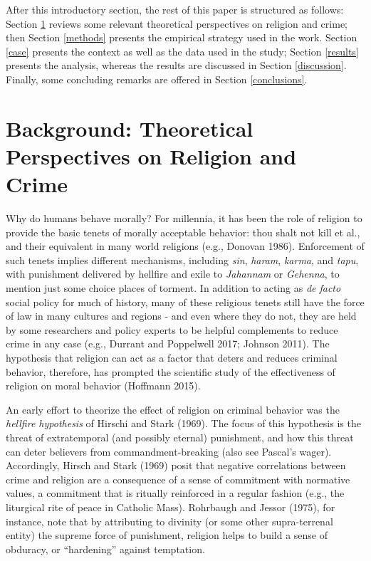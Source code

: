 \documentclass[smallextended]{svjour3}       %
\begin{document}
After this introductory section, the rest of this paper is structured as
follows: Section \ref{background} reviews some relevant theoretical
perspectives on religion and crime; then Section \ref{methods} presents
the empirical strategy used in the work. Section \ref{case} presents the
context as well as the data used in the study; Section \ref{results}
presents the analysis, whereas the results are discussed in Section
\ref{discussion}. Finally, some concluding remarks are offered in
Section \ref{conclusions}.

\hypertarget{background}{%
\section{Background: Theoretical Perspectives on Religion and
Crime}\label{background}}

Why do humans behave morally? For millennia, it has been the role of
religion to provide the basic tenets of morally acceptable behavior:
thou shalt not kill et al., and their equivalent in many world religions
(e.g., Donovan 1986). Enforcement of such tenets implies different
mechanisms, including \emph{sin}, \emph{haram}, \emph{karma}, and
\emph{tapu}, with punishment delivered by hellfire and exile to
\emph{Jahannam} or \emph{Gehenna}, to mention just some choice places of
torment. In addition to acting as \emph{de facto} social policy for much
of history, many of these religious tenets still have the force of law
in many cultures and regions - and even where they do not, they are held
by some researchers and policy experts to be helpful complements to
reduce crime in any case (e.g., Durrant and Poppelwell 2017; Johnson
2011). The hypothesis that religion can act as a factor that deters and
reduces criminal behavior, therefore, has prompted the scientific study
of the effectiveness of religion on moral behavior (Hoffmann 2015).

An early effort to theorize the effect of religion on criminal behavior
was the \emph{hellfire hypothesis} of Hirschi and Stark (1969). The
focus of this hypothesis is the threat of extratemporal (and possibly
eternal) punishment, and how this threat can deter believers from
commandment-breaking (also see Pascal's wager). Accordingly, Hirsch and
Stark (1969) posit that negative correlations between crime and religion
are a consequence of a sense of commitment with normative values, a
commitment that is ritually reinforced in a regular fashion (e.g., the
liturgical rite of peace in Catholic Mass). Rohrbaugh and Jessor (1975),
for instance, note that by attributing to divinity (or some other
supra-terrenal entity) the supreme force of punishment, religion helps
to build a sense of obduracy, or ``hardening'' against temptation.
\end{document}

